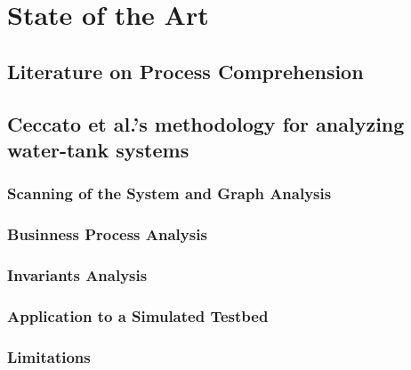 \chapter{State of the Art}
\label{state_of_art}

\section{Literature on Process Comprehension}
\label{sec:related_work}

\section{Ceccato et al.’s methodology for analyzing water-tank systems}
\label{sec:ceccato_metodology}

\subsection{Scanning of the System and Graph Analysis}
\label{subsec:ceccato_graphanalysis}

\subsection{Businness Process Analysis}
\label{subsec:ceccato_businessprocess}

\subsection{Invariants Analysis}
\label{subsec:ceccato_invariants}

\subsection{Application to a Simulated Testbed}
\label{subsec:ceccato_testbed}

\subsection{Limitations}
\label{subsec:ceccato_limitations}
